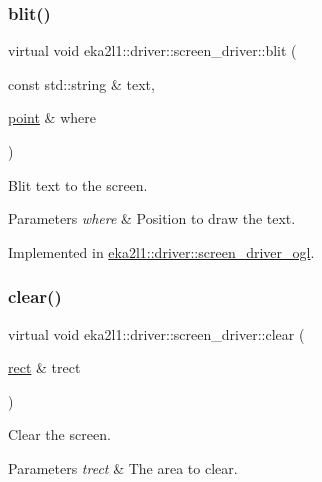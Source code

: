 \subsubsection{\texorpdfstring{blit()}{blit()}}
{\footnotesize\ttfamily virtual void eka2l1\+::driver\+::screen\+\_\+driver\+::blit (\begin{DoxyParamCaption}\item[{const std\+::string \&}]{text,  }\item[{\mbox{\hyperlink{structeka2l1_1_1vec2}{point}} \&}]{where }\end{DoxyParamCaption})\hspace{0.3cm}{\ttfamily [pure virtual]}}



Blit text to the screen. 


\begin{DoxyParams}{Parameters}
{\em where} & Position to draw the text. \\
\hline
\end{DoxyParams}


Implemented in \mbox{\hyperlink{classeka2l1_1_1driver_1_1screen__driver__ogl_ad1516779373ac8f97c42cc3dddf6cab1}{eka2l1\+::driver\+::screen\+\_\+driver\+\_\+ogl}}.

\mbox{\label{classeka2l1_1_1driver_1_1screen__driver_a9b963b43dc70b16781121238f713acb3}} 
\subsubsection{\texorpdfstring{clear()}{clear()}}
{\footnotesize\ttfamily virtual void eka2l1\+::driver\+::screen\+\_\+driver\+::clear (\begin{DoxyParamCaption}\item[{\mbox{\hyperlink{structeka2l1_1_1rect}{rect}} \&}]{trect }\end{DoxyParamCaption})\hspace{0.3cm}{\ttfamily [pure virtual]}}



Clear the screen. 


\begin{DoxyParams}{Parameters}
{\em trect} & The area to clear. \\
\hline
\end{DoxyParams}


